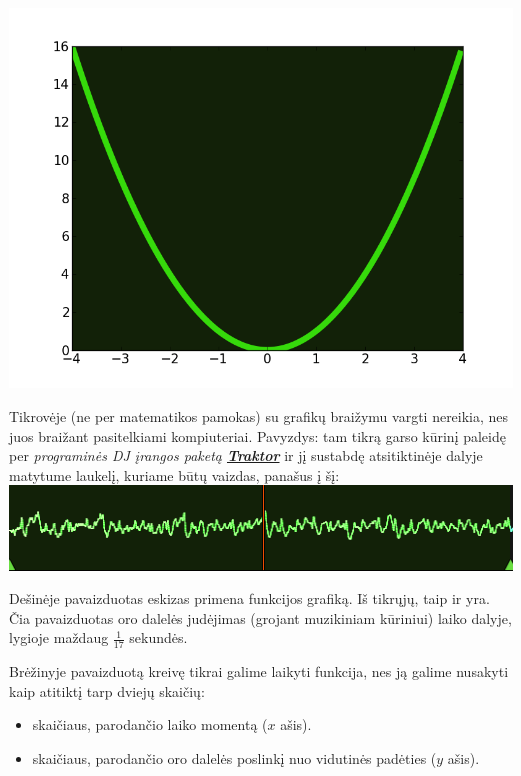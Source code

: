 \documentclass{article}
\begin{document}
\begin{minipage}[m]{0.49\textwidth}
\includegraphics[width=\textwidth]{functionex.png}
\end{minipage}
\begin{minipage}[m]{0.49\textwidth}
Tikrovėje (ne per matematikos pamokas) su grafikų braižymu vargti nereikia, nes juos braižant pasitelkiami kompiuteriai. Pavyzdys: tam tikrą garso kūrinį paleidę per \textit{programinės DJ įrangos paketą \href{https://www.native-instruments.com/en/products/traktor/dj-software/traktor-pro-2/demo-and-downloads/}{\textbf{Traktor}}} ir jį sustabdę atsitiktinėje dalyje matytume laukelį, kuriame būtų vaizdas, panašus į šį:
\includegraphics[width=\textwidth]{tractorex.png}
\end{minipage}

Dešinėje pavaizduotas eskizas primena funkcijos grafiką. Iš tikrųjų, taip ir yra. Čia pavaizduotas oro dalelės judėjimas (grojant muzikiniam kūriniui) laiko dalyje, lygioje maždaug $\frac{1}{17}$ sekundės. 

Brėžinyje pavaizduotą kreivę tikrai galime laikyti funkcija, nes ją galime nusakyti kaip atitiktį tarp dviejų skaičių:
\begin{itemize}
\item skaičiaus, parodančio laiko momentą ($x$ ašis).
\item skaičiaus, parodančio oro dalelės poslinkį nuo vidutinės padėties ($y$ ašis).
\end{itemize}
\end{document}
